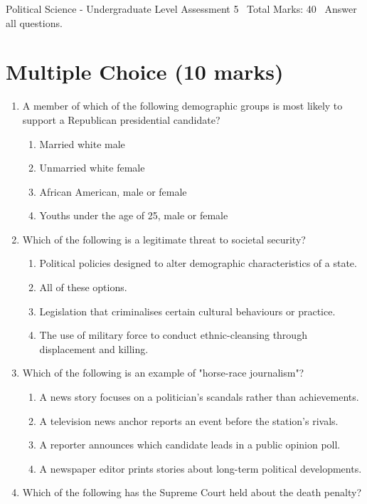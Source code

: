 \documentclass[12pt]{article}
\begin{document}
\begin{center}
Political Science - Undergraduate Level Assessment 5 \
Total Marks: 40 \
Answer all questions.
\end{center}

\section*{Multiple Choice (10 marks)}
\begin{enumerate}[label=\arabic*.]
\item A member of which of the following demographic groups is most likely to support a Republican presidential candidate?
\begin{enumerate}[label=(\alph*)]
    \item Married white male
    \item Unmarried white female
    \item African American, male or female
    \item Youths under the age of 25, male or female
\end{enumerate}
\item Which of the following is a legitimate threat to societal security?
\begin{enumerate}[label=(\alph*)]
    \item Political policies designed to alter demographic characteristics of a state.
    \item All of these options.
    \item Legislation that criminalises certain cultural behaviours or practice.
    \item The use of military force to conduct ethnic-cleansing through displacement and killing.
\end{enumerate}
\item Which of the following is an example of "horse-race journalism"?
\begin{enumerate}[label=(\alph*)]
    \item A news story focuses on a politician's scandals rather than achievements.
    \item A television news anchor reports an event before the station's rivals.
    \item A reporter announces which candidate leads in a public opinion poll.
    \item A newspaper editor prints stories about long-term political developments.
\end{enumerate}
\item Which of the following has the Supreme Court held about the death penalty?

\end{enumerate}
\end{document}
